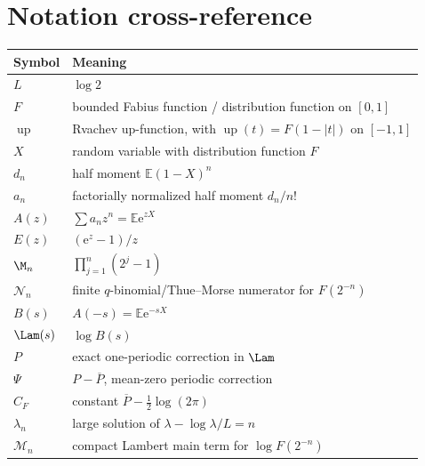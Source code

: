 \documentclass[11pt,oneside]{article}
\theoremstyle{definition}
\theoremstyle{remark}
\newcommand{\Up}{\operatorname{up}}
\newcommand{\e}{\mathrm e}
\newcommand{\E}{\mathbb E}
\begin{document}
\section{Notation cross-reference}
\label{dyadicasym:app:notation}

\begingroup\small
\begin{longtable}{@{}ll@{}}
\toprule
Symbol & Meaning\\
\midrule
\endhead
$L$ & $\log2$\\
$F$ & bounded Fabius function / distribution function on $[0,1]$\\
$\Up$ & Rvachev up-function, with $\Up(t)=F(1-|t|)$ on $[-1,1]$\\
$X$ & random variable with distribution function $F$\\
$d_n$ & half moment $\E(1-X)^n$\\
$a_n$ & factorially normalized half moment $d_n/n!$\\
$A(z)$ & $\sum a_nz^n=\E\e^{zX}$\\
$E(z)$ & $(\e^z-1)/z$\\
$\M_n$ & $\prod_{j=1}^n(2^j-1)$\\
$\mathcal N_n$ & finite $q$-binomial/Thue--Morse numerator for $F(2^{-n})$\\
$B(s)$ & $A(-s)=\E\e^{-sX}$\\
$\Lam(s)$ & $\log B(s)$\\
$P$ & exact one-periodic correction in $\Lam$\\
$\Psi$ & $P-\overline P$, mean-zero periodic correction\\
$C_F$ & constant $\overline P-\tfrac12\log(2\pi)$\\
$\lambda_n$ & large solution of $\lambda-\log\lambda/L=n$\\
$\mathcal M_n$ & compact Lambert main term for $\log F(2^{-n})$\\
\bottomrule
\end{longtable}
\endgroup
\end{document}
